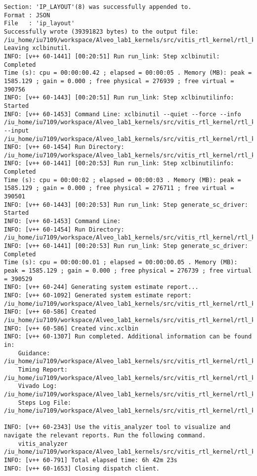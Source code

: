 \begin{center}
\begin{lstlisting}[label=lst:vlog,caption=Файл v++\_vinc.log]
Section: 'IP_LAYOUT'(8) was successfully appended to.
Format : JSON
File   : 'ip_layout'
Successfully wrote (39391823 bytes) to the output file: /iu_home/iu7109/workspace/Alveo_lab1_kernels/src/vitis_rtl_kernel/rtl_kernel_wizard_2/vinc.xclbin
Leaving xclbinutil.
INFO: [v++ 60-1441] [00:20:51] Run run_link: Step xclbinutil: Completed
Time (s): cpu = 00:00:00.42 ; elapsed = 00:00:05 . Memory (MB): peak = 1585.129 ; gain = 0.000 ; free physical = 276939 ; free virtual = 390756
INFO: [v++ 60-1443] [00:20:51] Run run_link: Step xclbinutilinfo: Started
INFO: [v++ 60-1453] Command Line: xclbinutil --quiet --force --info /iu_home/iu7109/workspace/Alveo_lab1_kernels/src/vitis_rtl_kernel/rtl_kernel_wizard_2/vinc.xclbin.info --input /iu_home/iu7109/workspace/Alveo_lab1_kernels/src/vitis_rtl_kernel/rtl_kernel_wizard_2/vinc.xclbin
INFO: [v++ 60-1454] Run Directory: /iu_home/iu7109/workspace/Alveo_lab1_kernels/src/vitis_rtl_kernel/rtl_kernel_wizard_2/_x/link/run_link
INFO: [v++ 60-1441] [00:20:53] Run run_link: Step xclbinutilinfo: Completed
Time (s): cpu = 00:00:02 ; elapsed = 00:00:03 . Memory (MB): peak = 1585.129 ; gain = 0.000 ; free physical = 276711 ; free virtual = 390501
INFO: [v++ 60-1443] [00:20:53] Run run_link: Step generate_sc_driver: Started
INFO: [v++ 60-1453] Command Line: 
INFO: [v++ 60-1454] Run Directory: /iu_home/iu7109/workspace/Alveo_lab1_kernels/src/vitis_rtl_kernel/rtl_kernel_wizard_2/_x/link/run_link
INFO: [v++ 60-1441] [00:20:53] Run run_link: Step generate_sc_driver: Completed
Time (s): cpu = 00:00:00.01 ; elapsed = 00:00:00.05 . Memory (MB): peak = 1585.129 ; gain = 0.000 ; free physical = 276739 ; free virtual = 390529
INFO: [v++ 60-244] Generating system estimate report...
INFO: [v++ 60-1092] Generated system estimate report: /iu_home/iu7109/workspace/Alveo_lab1_kernels/src/vitis_rtl_kernel/rtl_kernel_wizard_2/_x/reports/link/system_estimate_vinc.xtxt
INFO: [v++ 60-586] Created /iu_home/iu7109/workspace/Alveo_lab1_kernels/src/vitis_rtl_kernel/rtl_kernel_wizard_2/vinc.ltx
INFO: [v++ 60-586] Created vinc.xclbin
INFO: [v++ 60-1307] Run completed. Additional information can be found in:
	Guidance: /iu_home/iu7109/workspace/Alveo_lab1_kernels/src/vitis_rtl_kernel/rtl_kernel_wizard_2/_x/reports/link/v++_link_vinc_guidance.html
	Timing Report: /iu_home/iu7109/workspace/Alveo_lab1_kernels/src/vitis_rtl_kernel/rtl_kernel_wizard_2/_x/reports/link/imp/impl_1_xilinx_u200_xdma_201830_2_bb_locked_timing_summary_routed.rpt
	Vivado Log: /iu_home/iu7109/workspace/Alveo_lab1_kernels/src/vitis_rtl_kernel/rtl_kernel_wizard_2/_x/logs/link/vivado.log
	Steps Log File: /iu_home/iu7109/workspace/Alveo_lab1_kernels/src/vitis_rtl_kernel/rtl_kernel_wizard_2/_x/logs/link/link.steps.log

INFO: [v++ 60-2343] Use the vitis_analyzer tool to visualize and navigate the relevant reports. Run the following command. 
    vitis_analyzer /iu_home/iu7109/workspace/Alveo_lab1_kernels/src/vitis_rtl_kernel/rtl_kernel_wizard_2/vinc.xclbin.link_summary 
INFO: [v++ 60-791] Total elapsed time: 6h 42m 23s
INFO: [v++ 60-1653] Closing dispatch client.
\end{lstlisting}
\end{center}